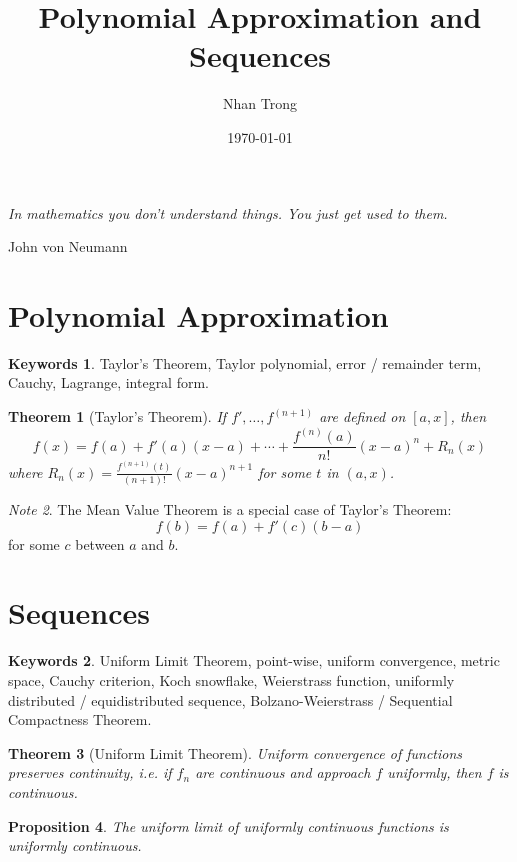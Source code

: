\documentclass[12pt]{article}
\title{Polynomial Approximation and Sequences}
\author{Nhan Trong}
\date{\today}                                           %
\theoremstyle{plain}
\newtheorem{theorem}{Theorem}
\newtheorem{proposition}[theorem]{Proposition}
\theoremstyle{definition}
\newtheorem{keywords}{Keywords}
\theoremstyle{remark}
\newtheorem{note}[theorem]{Note}
\begin{document}
\sloppy
\maketitle

\epigraph{\textit{In mathematics you don't understand things. You just get used to them.}}{John von Neumann}

\part{Polynomial Approximation}

\begin{keywords}
Taylor's Theorem, Taylor polynomial, error / remainder term, Cauchy, Lagrange, integral form.
\end{keywords}

\begin{theorem}[Taylor's Theorem]
If $f', \ldots, f^{(n+1)}$ are defined on $[a, x]$, then 
$$f(x) = f(a) + f'(a)(x - a) + \cdots + \frac{f^{(n)}(a)}{n!}(x - a)^n + R_n(x)$$
where $R_n(x) = \frac{f^{(n+1)}(t)}{(n+1)!}(x - a)^{n+1}$ for some $t$ in $(a, x)$.
\end{theorem}

\begin{note}
The Mean Value Theorem is a special case of Taylor's Theorem:
$$f(b) = f(a) + f'(c)(b - a)$$
for some $c$ between $a$ and $b$.
\end{note}

\part{Sequences}

\begin{keywords}
Uniform Limit Theorem, point-wise, uniform convergence, metric space, Cauchy criterion, Koch snowflake, Weierstrass function, uniformly distributed / equidistributed sequence, Bolzano-Weierstrass / Sequential Compactness Theorem.
\end{keywords}

\begin{theorem}[Uniform Limit Theorem]
Uniform convergence of functions preserves continuity, i.e. if $f_n$ are continuous and approach $f$ uniformly, then $f$ is continuous.
\end{theorem}

\begin{proposition}
The uniform limit of uniformly continuous functions is uniformly continuous.
\end{proposition}
\end{document}
